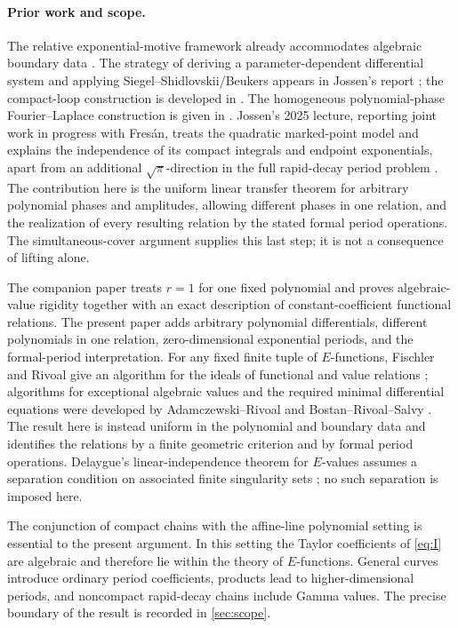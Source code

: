 \documentclass[11pt]{article}
\numberwithin{equation}{section}
\theoremstyle{definition}
\theoremstyle{remark}
\begin{document}
\paragraph{Prior work and scope.}
The relative exponential-motive framework already accommodates algebraic
boundary data \cite[Chapter~1]{FresanJossenExp}.  The strategy of deriving a
parameter-dependent differential system and applying
Siegel--Shidlovskii/Beukers appears in Jossen's report
\cite[\S\S2--3]{Jossen2018}; the compact-loop construction is developed in
\cite[\S12.7]{FresanJossenExp}.  The homogeneous polynomial-phase
Fourier--Laplace construction is given in
\cite[Proposition~5.1]{FresanJossen}.  Jossen's 2025 lecture, reporting joint
work in progress with Fres\'an, treats the quadratic marked-point model and
explains the independence of its compact integrals and endpoint
exponentials, apart from an additional $\sqrt\pi$-direction in the full
rapid-decay period problem \cite{Jossen2025}.  The contribution here is the
uniform linear transfer theorem for arbitrary polynomial phases and
amplitudes, allowing different phases in one relation, and the realization
of every resulting relation by the stated formal period operations.  The
simultaneous-cover argument supplies this last step; it is not a consequence
of lifting alone.

The companion paper \cite{LongEIT} treats $r=1$ for one fixed polynomial and
proves algebraic-value rigidity together with an exact description of
constant-coefficient functional relations.  The present paper adds arbitrary
polynomial differentials, different polynomials in one relation,
zero-dimensional exponential periods, and the formal-period interpretation.  For any fixed finite tuple
of $E$-functions, Fischler and Rivoal give an algorithm for the ideals of
functional and value relations \cite{FischlerRivoalEffective}; algorithms
for exceptional algebraic values and the required minimal differential
equations were developed by Adamczewski--Rivoal and
Bostan--Rivoal--Salvy \cite{AdamczewskiRivoal,BostanRivoalSalvy}.  The result
here is instead uniform in the polynomial and boundary data and identifies
the relations by a finite geometric criterion and by formal period
operations.  Delaygue's linear-independence theorem for $E$-values assumes
a separation condition on associated finite singularity sets
\cite{Delaygue}; no such separation is imposed here.

The conjunction of compact chains with the affine-line polynomial setting
is essential to the present argument.  In this setting the Taylor
coefficients of \eqref{eq:I} are algebraic and therefore lie within the
theory of $E$-functions.  General curves introduce ordinary period coefficients,
products lead to higher-dimensional periods, and noncompact rapid-decay
chains include Gamma values.  The precise boundary of the result is
recorded in \cref{sec:scope}.
\end{document}
